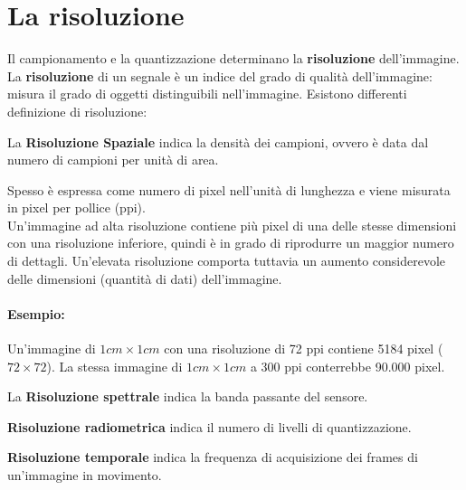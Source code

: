 \section{La risoluzione}
Il campionamento e la quantizzazione determinano la \textbf{risoluzione}
dell'immagine. \\

La \textbf{risoluzione} di un segnale è un indice del grado di qualità
dell'immagine: misura il grado di oggetti distinguibili nell'immagine. Esistono
differenti definizione di risoluzione:

\begin{definition}
    La \textbf{Risoluzione Spaziale} indica la densità dei campioni, ovvero è
    data dal numero di campioni per unità di area.
\end{definition}

Spesso è espressa come numero di pixel nell'unità di lunghezza e viene misurata
in pixel per pollice (ppi). \\Un'immagine ad alta risoluzione contiene più pixel
di una delle stesse dimensioni con una risoluzione inferiore, quindi è in grado
di riprodurre un maggior numero di dettagli. Un'elevata risoluzione comporta
tuttavia un aumento considerevole delle dimensioni (quantità di dati)
dell'immagine.

\paragraph{Esempio:}

Un'immagine di $1cm \times 1cm$ con una risoluzione di 72 ppi contiene 5184
pixel ($72 \times 72$). La stessa immagine di $1 cm \times 1 cm$ a 300 ppi
conterrebbe 90.000 pixel.

\begin{definition}
    La \textbf{Risoluzione spettrale} indica la banda passante del sensore.

\end{definition}


\begin{definition}
    \textbf{Risoluzione radiometrica} indica il numero di livelli di
    quantizzazione.

\end{definition}


\begin{definition}
    \textbf{Risoluzione temporale} indica la frequenza di acquisizione dei
    frames di un'immagine in movimento.
\end{definition}

